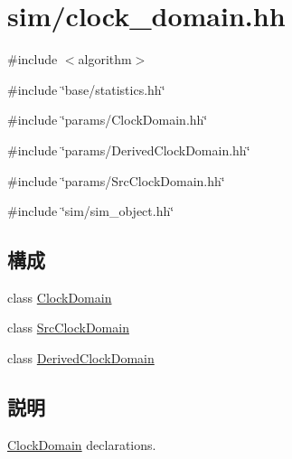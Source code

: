 \hypertarget{clock__domain_8hh}{
\section{sim/clock\_\-domain.hh}
\label{clock__domain_8hh}
}
{\ttfamily \#include $<$algorithm$>$}\par
{\ttfamily \#include \char`\"{}base/statistics.hh\char`\"{}}\par
{\ttfamily \#include \char`\"{}params/ClockDomain.hh\char`\"{}}\par
{\ttfamily \#include \char`\"{}params/DerivedClockDomain.hh\char`\"{}}\par
{\ttfamily \#include \char`\"{}params/SrcClockDomain.hh\char`\"{}}\par
{\ttfamily \#include \char`\"{}sim/sim\_\-object.hh\char`\"{}}\par
\subsection*{構成}
\begin{DoxyCompactItemize}
\item 
class \hyperlink{classClockDomain}{ClockDomain}
\item 
class \hyperlink{classSrcClockDomain}{SrcClockDomain}
\item 
class \hyperlink{classDerivedClockDomain}{DerivedClockDomain}
\end{DoxyCompactItemize}


\subsection{説明}
\hyperlink{classClockDomain}{ClockDomain} declarations. 